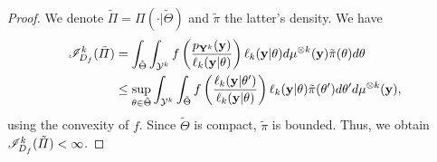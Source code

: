 \begin{proof}
    We denote $\tilde\varPi=\varPi(\cdot|\tilde\Theta)$ and  $\tilde\pi$ the latter's density. We have
        \begin{equation}
        \begin{aligned}
            \mathscr{I}^k_{D_f}(\tilde\varPi) &= \int_{\tilde\Theta}\int_{\mathcal{Y}^k} f\left( \frac{p_{\mathbf{Y}^k}(\mathbf{y})}{\ell_k(\mathbf{y}|\theta)}\right)\ell_k(\mathbf{y}|\theta) d\mu^{\otimes k}(\mathbf{y}) \tilde\pi(\theta)d\theta \\
                &\leq \sup_{\theta\in\tilde\Theta}\int_{\mathcal{Y}^k} \int_{\tilde\Theta} f\left( \frac{\ell_k(\mathbf{y}|\theta')}{\ell_k(\mathbf{y}|\theta)}\right)\ell_k(\mathbf{y}|\theta) \tilde\pi(\theta')d\theta' d\mu^{\otimes k}(\mathbf{y}) ,
        \end{aligned}
        \end{equation}
        using the convexity of $f$. Since $\tilde\Theta$ is compact, $\tilde\pi$ is bounded. Thus, we obtain $\mathscr{I}^k_{D_f}(\tilde\varPi)<\infty$.


\end{proof}
